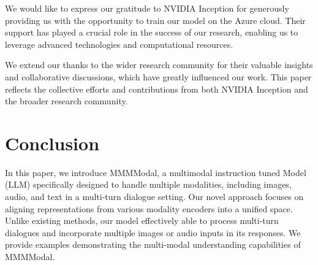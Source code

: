 \documentclass[preprint]{article}
\begin{document}
We would like to express our gratitude to NVIDIA Inception for generously providing us with the opportunity to train our model on the Azure cloud. Their support has played a crucial role in the success of our research, enabling us to leverage advanced technologies and computational resources.

We extend our thanks to the wider research community for their valuable insights and collaborative discussions, which have greatly influenced our work. This paper reflects the collective efforts and contributions from both NVIDIA Inception and the broader research community.

\section{Conclusion}

In this paper, we introduce MMMModal, a multimodal instruction tuned Model (LLM) specifically designed to handle multiple modalities, including images, audio, and text in a multi-turn dialogue setting. Our novel approach focuses on aligning representations from various modality encoders into a unified space. Unlike existing methods, our model effectively able to process multi-turn dialogues and incorporate multiple images or audio inputs in its responses. We provide examples demonstrating the multi-modal understanding capabilities of MMMModal.

{}

\end{document}
